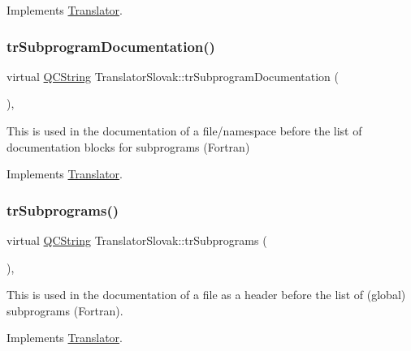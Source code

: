 Implements \mbox{\hyperlink{class_translator}{Translator}}.

\mbox{\label{class_translator_slovak_a9567a547a695495acf1a28b7a4947495}} 
\subsubsection{\texorpdfstring{trSubprogramDocumentation()}{trSubprogramDocumentation()}}
{\footnotesize\ttfamily virtual \mbox{\hyperlink{class_q_c_string}{Q\+C\+String}} Translator\+Slovak\+::tr\+Subprogram\+Documentation (\begin{DoxyParamCaption}{ }\end{DoxyParamCaption})\hspace{0.3cm}{\ttfamily [inline]}, {\ttfamily [virtual]}}

This is used in the documentation of a file/namespace before the list of documentation blocks for subprograms (Fortran) 

Implements \mbox{\hyperlink{class_translator}{Translator}}.

\mbox{\label{class_translator_slovak_ae40bb30c036c148d433580c8bf6d92fa}} 
\subsubsection{\texorpdfstring{trSubprograms()}{trSubprograms()}}
{\footnotesize\ttfamily virtual \mbox{\hyperlink{class_q_c_string}{Q\+C\+String}} Translator\+Slovak\+::tr\+Subprograms (\begin{DoxyParamCaption}{ }\end{DoxyParamCaption})\hspace{0.3cm}{\ttfamily [inline]}, {\ttfamily [virtual]}}

This is used in the documentation of a file as a header before the list of (global) subprograms (Fortran). 

Implements \mbox{\hyperlink{class_translator}{Translator}}.

\mbox{\label{class_translator_slovak_a1f46e859891bf5d789068c9fe73bb8d3}} 
